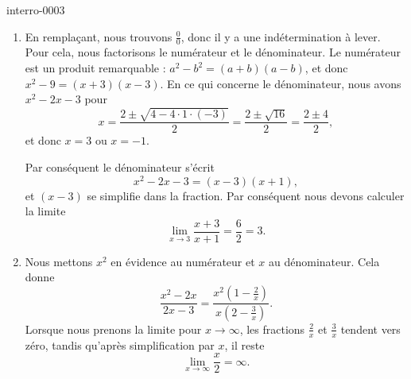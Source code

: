 
\begin{corrige}{interro-0003}

	\begin{enumerate}
		\item
			En remplaçant, nous trouvons $\frac{ 0 }{ 0 }$, donc il y a une indétermination à lever. Pour cela, nous factorisons le numérateur et le dénominateur. Le numérateur est un produit remarquable : $a^2-b^2=(a+b)(a-b)$, et donc $x^2-9=(x+3)(x-3)$. En ce qui concerne le dénominateur, nous avons $x^2-2x-3$ pour
			\begin{equation}
				x=\frac{ 2\pm\sqrt{4-4\cdot 1\cdot (-3)} }{ 2 }=\frac{ 2\pm\sqrt{16} }{ 2 }=\frac{ 2\pm 4 }{ 2 },
			\end{equation}
			et donc $x=3$ ou $x=-1$.

			Par conséquent le dénominateur s'écrit
			\begin{equation}
				x^2-2x-3=(x-3)(x+1),
			\end{equation}
			et $(x-3)$ se simplifie dans la fraction. Par conséquent nous devons calculer la limite
			\begin{equation}
				\lim_{x\to 3} \frac{ x+3 }{ x+1 }=\frac{ 6 }{ 2 }=3.
			\end{equation}
		\item
			Nous mettons $x^2$ en évidence au numérateur et $x$ au dénominateur. Cela donne
			\begin{equation}
				\frac{ x^2-2x }{ 2x-3 }=\frac{ x^2\left( 1-\frac{ 2 }{ x } \right) }{ x\left( 2-\frac{ 3 }{ x } \right) }.
			\end{equation}
			Lorsque nous prenons la limite pour $x\to \infty$, les fractions $\frac{ 2 }{ x }$ et $\frac{ 3 }{ x }$ tendent vers zéro, tandis qu'après simplification par $x$, il reste
			\begin{equation}
				\lim_{x\to \infty} \frac{ x }{ 2 }=\infty.
			\end{equation}
			

\end{enumerate}
\end{corrige}
